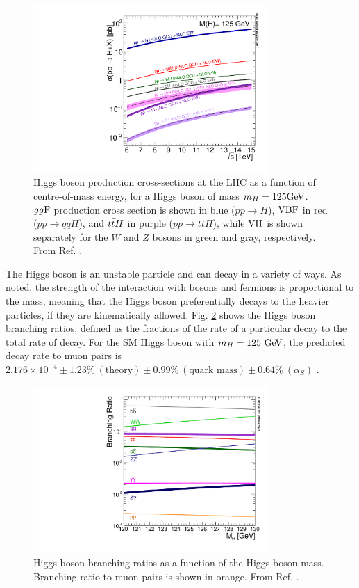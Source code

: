 \begin{figure}[h]
  \centering
  \includegraphics[width=0.8\textwidth]{figures/theory/HiggsProduction}
  \caption[Higgs boson production cross-sections at the LHC.]{Higgs boson production
  cross-sections at the LHC as a function of centre-of-mass energy, for a Higgs boson
  of mass $m_H = 125 \text{Ge\kern -0.1em V}$. $gg\text{F}$ production cross section is shown in blue
  ($pp \rightarrow H$), $\text{VBF}$ in red ($pp \rightarrow qqH$), and $t\bar{t} H$ in purple
  ($pp \rightarrow ttH$), while $\text{VH}$ is shown separately for the $W$ and $Z$ bosons
  in green and gray, respectively. From Ref. \cite{deFlorian:2016spz}.}
   \label{fig:the:prod}
\end{figure}

The Higgs boson is an unstable particle and can decay in a variety of ways. As noted,
the strength of the interaction with bosons and fermions is proportional to the mass,
meaning that the Higgs boson preferentially decays to the heavier particles, if they
are kinematically allowed. Fig. \ref{fig:the:decay} shows the Higgs boson branching
ratios, defined as the fractions of the rate of a particular decay to the total
rate of decay. For the SM Higgs boson with $m_H = 125~\text{Ge\kern -0.1em V}$, the predicted decay rate to muon pairs
is $2.176 \times 10^{-4}
\pm 1.23\%~(\text{theory})
\pm 0.99\%~(\text{quark mass})
\pm 0.64\%~(\alpha_S)$ \cite{deFlorian:2016spz}. 

\begin{figure}[h]
  \centering
  \includegraphics[width=0.8\textwidth]{figures/theory/HiggsDecay}
  \caption[Higgs boson branching ratios.]{Higgs boson branching ratios as a function
  of the Higgs boson mass. Branching ratio to muon pairs is shown in orange.
  From Ref. \cite{deFlorian:2016spz}.}
   \label{fig:the:decay}
\end{figure}

